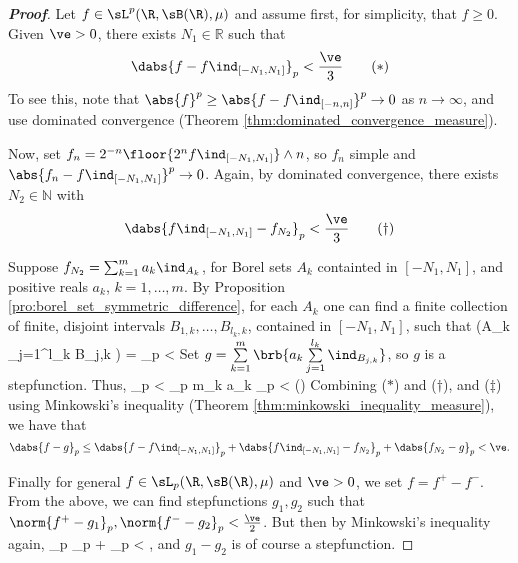\begin{proof}[\bf Proof]
Let $f \in \sL^p(\R,\sB(\R),\mu)$ and assume first, for simplicity, that $f \geq 0$. Given $\ve>0$, there exists $N_1 \in \mathbb{R}$ such that
\begin{equation}
 \dabs{f-f\ind_{[-N_1,N_1]}}_p < \frac{\ve}{3}\quad\quad (*)
\end{equation}
To see this, note that $\abs{f}^p \geq \abs{f-f\ind_{[-n,n]}}^p \to 0$ as $n \to \infty$, and use dominated convergence (Theorem \ref{thm:dominated_convergence_measure}).

Now, set $f_n = 2^{-n} \floor{2^n f \ind_{[-N_1,N_1]}} \wedge n$, so $f_n$ simple and $\abs{f_n - f\ind_{[-N_1,N_1]}}^p \to 0$. Again, by dominated convergence, there exists $N_2 \in \mathbb{N}$ with
\begin{equation}
\dabs{f\ind_{[-N_1,N_1]} - f_{N_2}}_p < \frac{\ve}{3}\quad\quad (\dag)
\end{equation}

Suppose $f_{N_2} = \sum_{k=1} ^m a_k \ind _{A_k}$, for Borel sets $A_k$ containted in $[-N_1,N_1]$, and positive reals $a_k$, $k=1,\ldots,m$. By Proposition \ref{pro:borel_set_symmetric_difference}, for each $A_k$ one can find a finite collection of finite, disjoint intervals $B_{1,k},\dots,B_{l_k, k}$, contained in $[-N_1,N_1]$, such that
\be
\mu\left(A_k \triangle \bigcup_{j=1}^{l_k} B_{j,k} \right) = _p < 
\ee
Set $g= \sum\limits_{k=1} ^m \brb{ a_k \sum\limits_{j=1} ^{l_k} \ind_{B_{j,k}} }$, so $g$ is a stepfunction. Thus,
\be
{}_p < _p \leq m\max_k a_k _p < \quad \quad (\ddag)
\ee
Combining ($*$) and ($\dag$), and ($\ddag$) using Minkowski's inequality (Theorem \ref{thm:minkowski_inequality_measure}), we have that
\[
 \dabs{f-g}_p \leq \dabs{f-f\ind_{[-N_1,N_1]}}_p + \dabs{f\ind_{[-N_1,N_1]} - f_{N_2}}_p + \dabs{f_{N_2} - g}_p < \ve.
\]

Finally for general $f \in \sL_p(\R,\sB(\R),\mu)$ and $\ve >0$, we set $f = f^+ - f^-$. From the above, we can find stepfunctions $g_1, g_2$ such that $\norm{f^+ - g_1}_p, \norm{f^- - g_2}_p < \frac{\ve}{2}$. But then by Minkowski's inequality again,
\be
{}_p \leq {}_p + _p < \epsilon,
\ee
and $g_1 - g_2$ is of course a stepfunction.
\end{proof}




